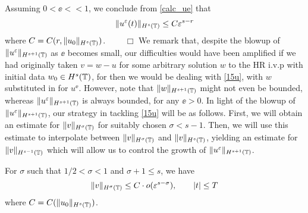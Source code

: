 Assuming $0 < \ee <<1$, we conclude from \eqref{calc_ue} that 
\begin{equation*}
\begin{split}
\|u^\varepsilon(t)\|_{H^s(\mathbb{T})} \le C \varepsilon^{s-r}
\end{split}
\end{equation*}
where $C = C(r, \|u_0\|_{H^s(\mathbb{T})})$. $\qquad \Box$
We remark that, despite the blowup of $\|u^\varepsilon \|_{H^{s+1}(\mathbb{T})}$
as $\ee$ becomes small, our difficulties would have been
amplified if we had originally taken $v=w-u$ for some arbitrary
solution $w$ to the HR
i.v.p with initial data $w_0 \in H^s(\mathbb{T})$, for then we would be dealing with
\eqref{15u}, with $w$ substituted in for $u^\ee$. However, note that 
$\|w\|_{H^{s+1}(\mathbb{T})}$ might not even be bounded, whereas $\|u^\varepsilon
\|_{H^{s+1}(\mathbb{T})}$ is always bounded, for any $\ee > 0$.
%
%
In light of the blowup of $\|u^\varepsilon \|_{H^{s+1}(\mathbb{T})}$,
our strategy in tackling
\eqref{15u} will be as follows. First, we will obtain an estimate for
$\|v\|_{H^\sigma(\mathbb{T})}$ for suitably chosen $\sigma < s-1$. Then, we
will use this estimate to interpolate between $\|v\|_{H^\sigma(\mathbb{T})}$
and $\|v\|_{H^s(\mathbb{T})}$,
yielding an estimate for $\|v\|_{H^{s-1}(\mathbb{T})}$ which will allow us to control the growth of
$\|u^\varepsilon\|_{H^{s+1}(\mathbb{T})}$. 
%
%
%
%
\begin{lemma} 
\label{lem6r}
For $\sigma$ such that $1/2 < \sigma < 1$ and $\sigma + 1 \le s$, we have
\begin{equation}
\begin{split}
\|v\|_{H^{\sigma}(\mathbb{T})} \le C \cdot o(\varepsilon^{s- \sigma }), \qquad |t| \le T
\end{split}
\end{equation}
where $C=C(\|u_0\|_{H^s(\mathbb{T})})$.
\end{lemma}
%
%
%
